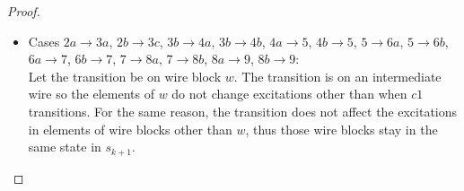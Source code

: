 \documentclass[12pt]{report}
\begin{document}
\begin{proof}
\begin{itemize}
\item
Cases $2a\rightarrow 3a$, $2b\rightarrow 3c$, $3b\rightarrow 4a$, $3b\rightarrow 4b$, $4a\rightarrow 5$, $4b\rightarrow 5$, $5\rightarrow 6a$, $5\rightarrow 6b$, $6a\rightarrow 7$, $6b\rightarrow 7$, $7\rightarrow 8a$, $7\rightarrow 8b$, $8a\rightarrow 9$, $8b\rightarrow 9$: \\ 
Let the transition be on wire block $w$.  The transition is on an intermediate wire so the elements of $w$ do not change excitations other than when $c1$ transitions.  
For the same reason, the transition does not affect the excitations in elements of wire blocks other than $w$, thus those wire blocks stay in the same state in $s_{k+1}$.  

\end{itemize}
\end{proof}
\end{document}
